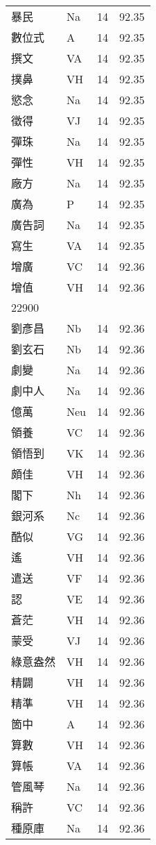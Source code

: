 \documentclass[twocolumn]{book}
\begin{document}
\begin{supertabular}{llrr}
暴民 & Na & 14 &  92.35\\
數位式 & A & 14 &  92.35\\
撰文 & VA & 14 &  92.35\\
撲鼻 & VH & 14 &  92.35\\
慾念 & Na & 14 &  92.35\\
徵得 & VJ & 14 &  92.35\\
彈珠 & Na & 14 &  92.35\\
彈性 & VH & 14 &  92.35\\
廠方 & Na & 14 &  92.35\\
廣為 & P & 14 &  92.35\\
廣告詞 & Na & 14 &  92.35\\
寫生 & VA & 14 &  92.35\\
增廣 & VC & 14 &  92.36\\
增值 & VH & 14 &  92.36\\
22900\\
劉彥昌 & Nb & 14 &  92.36\\
劉玄石 & Nb & 14 &  92.36\\
劇變 & Na & 14 &  92.36\\
劇中人 & Na & 14 &  92.36\\
億萬 & Neu & 14 &  92.36\\
領養 & VC & 14 &  92.36\\
領悟到 & VK & 14 &  92.36\\
頗佳 & VH & 14 &  92.36\\
閣下 & Nh & 14 &  92.36\\
銀河系 & Nc & 14 &  92.36\\
酷似 & VG & 14 &  92.36\\
遙 & VH & 14 &  92.36\\
遣送 & VF & 14 &  92.36\\
認 & VE & 14 &  92.36\\
蒼茫 & VH & 14 &  92.36\\
蒙受 & VJ & 14 &  92.36\\
綠意盎然 & VH & 14 &  92.36\\
精闢 & VH & 14 &  92.36\\
精準 & VH & 14 &  92.36\\
箇中 & A & 14 &  92.36\\
算數 & VH & 14 &  92.36\\
算帳 & VA & 14 &  92.36\\
管風琴 & Na & 14 &  92.36\\
稱許 & VC & 14 &  92.36\\
種原庫 & Na & 14 &  92.36\\

\end{supertabular}
\end{document}
